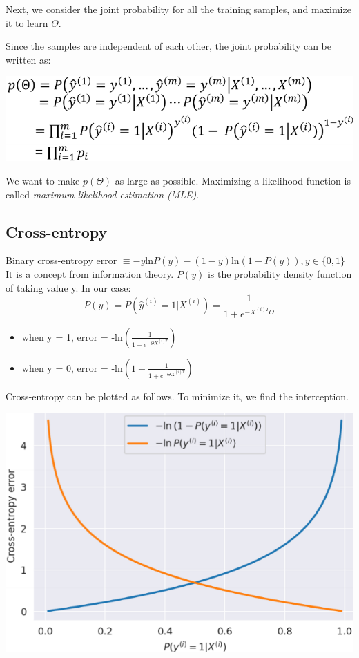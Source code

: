 \documentclass[letterpaper,12pt]{article}
\begin{document}
Next, we consider the joint probability for all the training samples, and
maximize it to learn $\Theta$.

Since the samples are independent of each other, the joint probability can be
written as:

\includegraphics[scale = 0.9]{./Image/Joint probability of supervision critiria.png}

We want to make $p(\Theta)$ as large as possible. Maximizing a likelihood
function is called \textit{maximum likelihood estimation (MLE)}.

\subsection{Cross-entropy}
Binary cross-entropy error $\equiv
    -y\text{ln}P(y)-(1-y)\text{ln}(1-P(y)),y\in\{0,1\}$ It is a concept from
information theory. $P(y)$ is the probability density function of taking value
y. In our case:
\[
    P(y)=P(\hat{y}^{(i)}=1|X^{(i)})=\frac{1}{1+e^{- X^{(i)T}\Theta}}
\]

\begin{itemize}
    \item when y = 1, error = -ln$(\frac{1}{1+e^{-\Theta X^{(i)T}}})$
    \item when y = 0, error = -ln$(1-\frac{1}{1+e^{-\Theta X^{(i)T}}})$
\end{itemize}

Cross-entropy can be plotted as follows. To minimize it, we find the
interception.

\includegraphics*{./Image/cross entropy.png}
\end{document}
